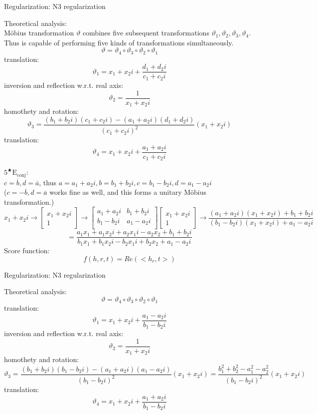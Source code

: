 \documentclass[9pt]{ctexart}
\theoremstyle{definition}
\begin{document}
Regularization: N3 regularization

Theoretical analysis:\\
Möbius transformation $\vartheta$ combines five subsequent transformations $\vartheta_1, \vartheta_2, \vartheta_3, \vartheta_4$. 
Thus is capable of performing five kinds of transformations simultaneously.
\[\vartheta=\vartheta_4 \circ \vartheta_3 \circ \vartheta_2 \circ \vartheta_1\]
translation: 
\[\vartheta_1=x_1+x_2i+\frac{d_1+d_2i}{c_1+c_2i}\]
inversion and reflection w.r.t. real axis: 
\[\vartheta_2=\frac{1}{x_1+x_2i}\]
homothety and rotation: 
\[\vartheta_3=\frac{(b_1+b_2i)(c_1+c_2i)-(a_1+a_2i)(d_1+d_2i)}{(c_1+c_2i)^2} (x_1+x_2i)\]
translation:
\[\vartheta_4=x_1+x_2i+\frac{a_1+a_2i}{c_1+c_2i}\]

$5^{\bigstar}\mathrm{E_{conj}}$:\\
$c = \overline{b}, d = \overline{a}$, thus $a=a_1+a_2i, b=b_1+b_2i, c=b_1-b_2i, d=a_1-a_2i$\\
($c = -\overline{b}, d = \overline{a}$ works fine as well, and this forms a unitary Möbius transformation.)
\[
    x_1+x_2i \rightarrow
    \begin{bmatrix}
        x_1+x_2i\\
        1
    \end{bmatrix}
    \rightarrow
    \begin{bmatrix}
        a_1+a_2i & b_1+b_2i\\
        b_1-b_2i & a_1-a_2i\\
    \end{bmatrix}
    \begin{bmatrix}
        x_1+x_2i\\
        1
    \end{bmatrix}
    \rightarrow
    \frac{(a_1+a_2i)(x_1+x_2i)+b_1+b_2i}{(b_1-b_2i)(x_1+x_2i)+a_1-a_2i} 
    \]
\[
    =\frac{a_1x_1+a_1x_2i+a_2x_1i-a_2x_2+b_1+b_2i}{b_1x_1+b_1x_2i-b_2x_1i+b_2x_2+a_1-a_2i}
    \]
Score function:
\[
    f(h,r,t)=Re(<h_r,t>)
    \]

Regularization: N3 regularization

Theoretical analysis:
\[\vartheta=\vartheta_4 \circ \vartheta_3 \circ \vartheta_2 \circ \vartheta_1\]
translation: 
\[\vartheta_1=x_1+x_2i+\frac{a_1-a_2i}{b_1-b_2i}\]
inversion and reflection w.r.t. real axis: 
\[\vartheta_2=\frac{1}{x_1+x_2i}\]
homothety and rotation: 
\[\vartheta_3=\frac{(b_1+b_2i)(b_1-b_2i)-(a_1+a_2i)(a_1-a_2i)}{(b_1-b_2i)^2} (x_1+x_2i)=\frac{b_1^2+b_2^2-a_1^2-a_2^2}{(b_1-b_2i)^2}(x_1+x_2i)\]
translation:
\[\vartheta_4=x_1+x_2i+\frac{a_1+a_2i}{b_1-b_2i}\]
\end{document}
